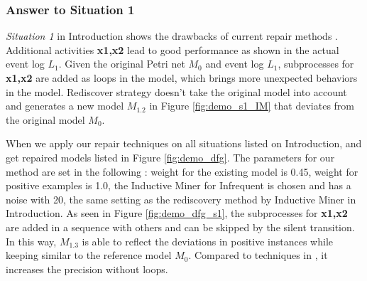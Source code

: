 \subsubsection{Answer to Situation 1}
\emph{Situation 1} in Introduction shows the drawbacks of current repair methods \cite{fahland2015model, dees2017enhancing}. Additional activities \textbf{x1,x2} lead to good performance as shown in the actual event log $L_1$. Given the original Petri net $M_0$ and event log $L_1$, subprocesses for \textbf{x1,x2} are added as loops in the model, which brings more unexpected behaviors in the model. Rediscover strategy doesn't take the original model into account and generates a new model $M_{1.2}$ in Figure \ref{fig:demo_s1_IM} that deviates from the original model $M_0$. 

When we apply our repair techniques on all situations listed on Introduction, and get repaired models listed in Figure \ref{fig:demo_dfg}. The parameters for our method are set in the following : weight for the existing model is 0.45, weight for positive examples is 1.0, the Inductive Miner for Infrequent is chosen and has a noise with 20, the same setting as the rediscovery method by Inductive Miner in Introduction. As seen in Figure \ref{fig:demo_dfg_s1}, the subprocesses for \textbf{x1,x2} are added in a sequence with others and can be skipped by the silent transition. In this way, $M_{1.3}$ is able to reflect the deviations in positive instances while keeping similar to the reference model $M_0$. Compared to techniques in \cite{fahland2015model}, it increases the precision without loops.
